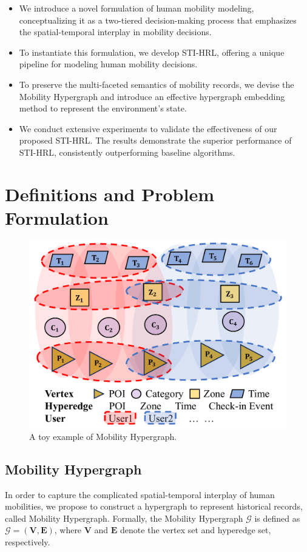 \documentclass[letterpaper]{article} %
\begin{document}
\begin{itemize}
\item We introduce a novel formulation of human mobility modeling, conceptualizing it as a two-tiered decision-making process that emphasizes the spatial-temporal interplay in mobility decisions.
\item To instantiate this formulation, we develop STI-HRL, offering a unique pipeline for modeling human mobility decisions.
\item To preserve the multi-faceted semantics of mobility records, we devise the Mobility Hypergraph and introduce an effective hypergraph embedding method to represent the environment's state.
\item We conduct extensive experiments to validate the effectiveness of our proposed STI-HRL. The results demonstrate the superior performance of STI-HRL, consistently outperforming baseline algorithms.
\end{itemize}


\section{Definitions and Problem Formulation}

\begin{figure}[!t]
\centering
\includegraphics[width=\linewidth]{hypergraph.pdf}
\caption{A toy example of Mobility Hypergraph.}
\label{fig:mobility hypergraph}
\end{figure}
\subsection{Mobility Hypergraph}
In order to capture the complicated spatial-temporal interplay of human mobilities, we propose to construct a hypergraph to represent historical records, called Mobility Hypergraph.
Formally, the Mobility Hypergraph $\mathcal{G}$ is defined as $\mathcal{G} = (\mathbf{V}, \mathbf{E})$, where $\mathbf{V}$ and $\mathbf{E}$ denote the vertex set and hyperedge set, respectively.
\end{document}
